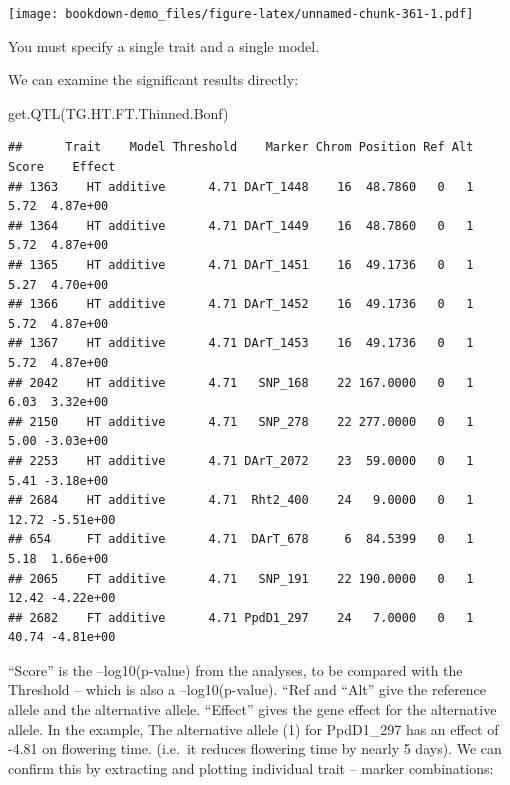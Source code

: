 \documentclass[
]{book}
\newenvironment{Shaded}{\begin{snugshade}}{\end{snugshade}}
\newcommand{\AttributeTok}[1]{\textcolor[rgb]{0.77,0.63,0.00}{#1}}
\newcommand{\FunctionTok}[1]{\textcolor[rgb]{0.00,0.00,0.00}{#1}}
\newcommand{\NormalTok}[1]{#1}
\newcommand{\SpecialCharTok}[1]{\textcolor[rgb]{0.00,0.00,0.00}{#1}}
\begin{document}
\texttt{[image: bookdown-demo\_files/figure-latex/unnamed-chunk-361-1.pdf]}

You must specify a single trait and a single model.

We can examine the significant results directly:

\begin{Shaded}
\begin{Highlighting}[]
\FunctionTok{get.QTL}\NormalTok{(TG.HT.FT.Thinned.Bonf)}
\end{Highlighting}
\end{Shaded}

\begin{verbatim}
##      Trait    Model Threshold    Marker Chrom Position Ref Alt Score    Effect
## 1363    HT additive      4.71 DArT_1448    16  48.7860   0   1  5.72  4.87e+00
## 1364    HT additive      4.71 DArT_1449    16  48.7860   0   1  5.72  4.87e+00
## 1365    HT additive      4.71 DArT_1451    16  49.1736   0   1  5.27  4.70e+00
## 1366    HT additive      4.71 DArT_1452    16  49.1736   0   1  5.72  4.87e+00
## 1367    HT additive      4.71 DArT_1453    16  49.1736   0   1  5.72  4.87e+00
## 2042    HT additive      4.71   SNP_168    22 167.0000   0   1  6.03  3.32e+00
## 2150    HT additive      4.71   SNP_278    22 277.0000   0   1  5.00 -3.03e+00
## 2253    HT additive      4.71 DArT_2072    23  59.0000   0   1  5.41 -3.18e+00
## 2684    HT additive      4.71  Rht2_400    24   9.0000   0   1 12.72 -5.51e+00
## 654     FT additive      4.71  DArT_678     6  84.5399   0   1  5.18  1.66e+00
## 2065    FT additive      4.71   SNP_191    22 190.0000   0   1 12.42 -4.22e+00
## 2682    FT additive      4.71 PpdD1_297    24   7.0000   0   1 40.74 -4.81e+00
\end{verbatim}

``Score'' is the --log10(p-value) from the analyses, to be compared with the Threshold -- which is also a --log10(p-value). ``Ref and ``Alt'' give the reference allele and the alternative allele. ``Effect'' gives the gene effect for the alternative allele. In the example, The alternative allele (1) for PpdD1\_297 has an effect of -4.81 on flowering time. (i.e.~it reduces flowering time by nearly 5 days). We can confirm this by extracting and plotting individual trait -- marker combinations:

\begin{Shaded}
\end{Shaded}
\end{document}
